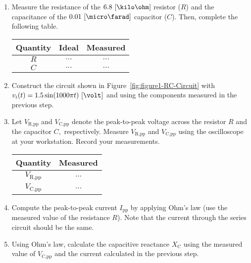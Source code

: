 \begin{enumerate}

 
\item Measure the resistance of the $6.8~[\kilo\ohm]$ resistor ($R$) and the capacitance of the $0.01~[\micro\farad]$ capacitor ($C$). Then, complete the following table.

  \begin{center}
    \begin{tabular}{c|c|c}
      \toprule
      Quantity &  Ideal & Measured\\
      \toprule
      $R$ & $\ldots$ & $\ldots$\\   %
      $C$ & $\ldots$ & $\ldots$\\   %
      \bottomrule
    \end{tabular}    
  \end{center}
  
\item Construct the circuit shown in Figure~\ref{fig:figure1-RC-Circuit} with $v_i(t) = 1.5\sin(1000\pi t)~[\volt]$ and  using the components measured in the previous step. 

\item Let $V_{\text{R,pp}}$ and $V_{\text{C,pp}}$ denote the peak-to-peak voltage across the resistor $R$ and the capacitor $C,$ respectively. Measure $V_{\text{R,pp}}$ and $V_{\text{C,pp}}$ using the oscilloscope at your workstation. Record your measurements. 

  \begin{center}
    \begin{tabular}{c|c}
      \toprule
      Quantity &  Measured\\
      \toprule
      $V_{\text{R,pp}}$ & $\ldots$\\   %
      $V_{\text{C,pp}}$ & $\ldots$\\   %
      \bottomrule
    \end{tabular}    
  \end{center}
  
\item Compute the peak-to-peak current $I_{\text{pp}}$ by applying Ohm's law (use the measured value of the resistance $R$). Note that the current through the series circuit  should be the same. \label{item:I-C}


  
\item Using Ohm's law, calculate the capacitive reactance $X_{\text{C}}$ using the measured value of $V_{\text{C,pp}}$ and the current calculated in the previous step.


\end{enumerate}
